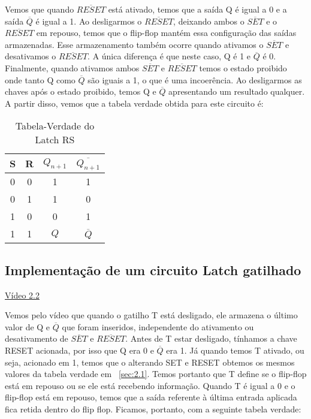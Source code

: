 \documentclass[12pt]{article}
\begin{document}
Vemos que quando $\overline{RESET}$ está ativado, temos que a saída Q é igual a 0 e a saída $\overline{Q}$ é igual a 1. Ao desligarmos o $\overline{RESET}$, deixando ambos o $\overline{SET}$ e o $\overline{RESET}$ em repouso, temos que o flip-flop mantém essa configuração das saídas armazenadas. Esse armazenamento também ocorre quando ativamos o $\overline{SET}$ e desativamos o $\overline{RESET}$. A única diferença é que neste caso, Q é 1 e $\overline{Q}$ é 0. Finalmente, quando ativamos ambos $\overline{SET}$ e $\overline{RESET}$ temos o estado proibido onde tanto Q como $\overline{Q}$ são iguais a 1, o que é uma incoerência. Ao desligarmos as chaves após o estado proibido, temos Q e $\overline{Q}$ apresentando um resultado qualquer. 
A partir disso, vemos que a tabela verdade obtida para este circuito é:

\begin{table}[H]
	\centering
	\begin{tabular}{|c|c|c|c|}
		\cline{1-4}
		\multicolumn{1}{|c|}{S} & \multicolumn{1}{|c|}{R} & \multicolumn{1}{|c|}{$Q_{n+1}$} & \multicolumn{1}{|c|}{$\overline{Q_{n+1}}$} \\
		\hline
		0 & 0 & 1 & 1  \\
		\hline
		0 & 1 & 1 & 0 \\
		\hline
		1 & 0 & 0 & 1  \\
		\hline
		1 & 1 & $Q$ & $\overline{Q}$  \\
		\hline
	\end{tabular}
	\caption{Tabela-Verdade do Latch RS}
\end{table}


\subsection{Implementação de um circuito Latch gatilhado}
\label{sec:2.2}

\href{https://youtu.be/azJt3y337BE}{Vídeo 2.2}

Vemos pelo vídeo que quando o gatilho T está desligado, ele armazena o último valor de Q e $\overline{Q}$ que foram inseridos, independente do ativamento ou desativamento de $\overline{SET}$ e $\overline{RESET}$. Antes de T estar desligado, tínhamos a chave RESET acionada, por isso que Q era 0 e $\overline{Q}$ era 1. Já quando temos T ativado, ou seja, acionado em 1, temos que o alterando SET e RESET obtemos os mesmos valores da tabela verdade em ~\ref{sec:2.1}. Temos portanto que T define se o flip-flop está em repouso ou se ele está recebendo informação. Quando T é igual a 0 e o flip-flop está em repouso, temos que a saída referente à última entrada aplicada fica retida dentro do flip flop. Ficamos, portanto, com a seguinte tabela verdade:
\end{document}
